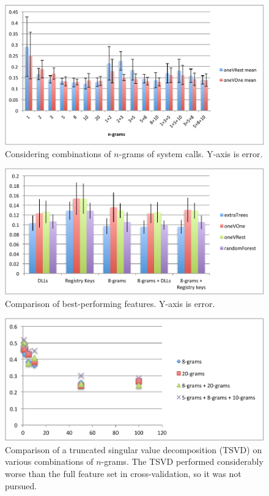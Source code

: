 \documentclass[11pt]{amsart}
\begin{document}
\begin{figure}
  \includegraphics{n-grams-combos.pdf}
  \caption{Considering combinations of $n$-grams of system calls. Y-axis is error.}
\end{figure}

\begin{figure}
  \includegraphics{other_features.pdf}
  \caption{Comparison of best-performing features. Y-axis is error.}
\end{figure}

\begin{figure}
  \includegraphics{tsvd.pdf}
  \caption{Comparison of a truncated singular value decomposition (TSVD) on various combinations of $n$-grams. The TSVD performed considerably worse than the full feature set in cross-validation, so it was not pursued.}
\end{figure}
\end{document}
